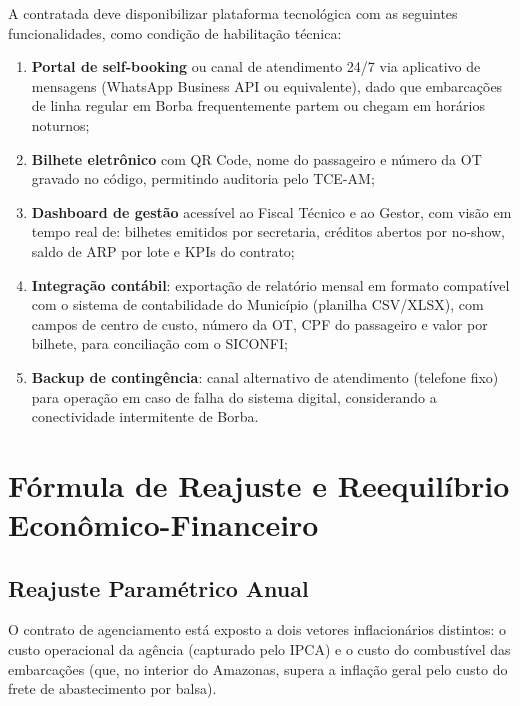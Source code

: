 \documentclass[12pt,a4paper]{article}
\begin{document}
A contratada deve disponibilizar plataforma tecnológica com as seguintes
funcionalidades, como condição de habilitação técnica:

\begin{enumerate}
  \item \textbf{Portal de self-booking} ou canal de atendimento 24/7 via
    aplicativo de mensagens (WhatsApp Business API ou equivalente), dado
    que embarcações de linha regular em Borba frequentemente partem ou
    chegam em horários noturnos;

  \item \textbf{Bilhete eletrônico} com QR Code, nome do passageiro e
    número da OT gravado no código, permitindo auditoria pelo TCE-AM;

  \item \textbf{Dashboard de gestão} acessível ao Fiscal Técnico e ao Gestor,
    com visão em tempo real de: bilhetes emitidos por secretaria, créditos
    abertos por no-show, saldo de ARP por lote e KPIs do contrato;

  \item \textbf{Integração contábil}: exportação de relatório mensal em
    formato compatível com o sistema de contabilidade do Município
    (planilha CSV/XLSX), com campos de centro de custo, número da OT,
    CPF do passageiro e valor por bilhete, para conciliação com o SICONFI;

  \item \textbf{Backup de contingência}: canal alternativo de atendimento
    (telefone fixo) para operação em caso de falha do sistema digital,
    considerando a conectividade intermitente de Borba.
\end{enumerate}

\section{Fórmula de Reajuste e Reequilíbrio Econômico-Financeiro}

\subsection{Reajuste Paramétrico Anual}

O contrato de agenciamento está exposto a dois vetores inflacionários
distintos: o custo operacional da agência (capturado pelo IPCA) e o custo
do combustível das embarcações (que, no interior do Amazonas, supera a
inflação geral pelo custo do frete de abastecimento por balsa).
\end{document}
